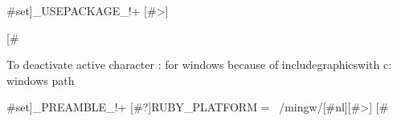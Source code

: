 {#set]_USEPACKAGE_!+
[#>]\usepackage[french]{babel}
[#}

To deactivate active character : for windows because of includegraphicswith c: windows path

{#set]_PREAMBLE_!+
[#?]RUBY_PLATFORM =~ /mingw/[#nl][#>]%
\shorthandoff{:}
[#}


